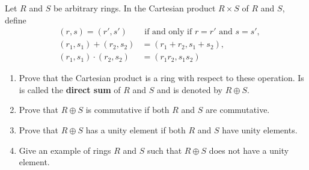 \documentclass[paper=a4, fontsize=11pt]{jhwhw} %
\begin{document}
Let $R$ and $S$ be arbitrary rings. In the Cartesian product $R\times S$ of $R$ and $S$, define
\begin{align*}
    &(r, s) = (r', s') &\text{ if and only if } r = r' \text{ and } s = s',\\
    &(r_1, s_1) + (r_2, s_2) &= (r_1 + r_2, s_1 + s_2),\\
    &(r_1, s_1)\cdot (r_2, s_2) &= (r_1r_2, s_1s_2)
\end{align*}
\begin{enumerate}
    \item Prove that the Cartesian product is a ring with respect to these operation. Is is called the \textbf{direct sum} of $R$ and $S$ and is denoted by $R\oplus S$.
    \item Prove that $R\oplus S$ is commutative if both $R$ and $S$ are commutative.
    \item Prove that $R\oplus S$ has a unity element if both $R$ and $S$ have unity elements.
    \item Give an example of rings $R$ and $S$ such that $R\oplus S$ does not have a unity element.
\end{enumerate}
\solution
\end{document}
